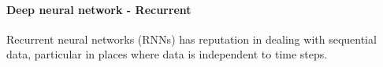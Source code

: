 \paragraph{Deep neural network - Recurrent}
Recurrent neural networks (RNNs) has reputation in dealing with sequential data, particular in places where data is independent to time steps. 